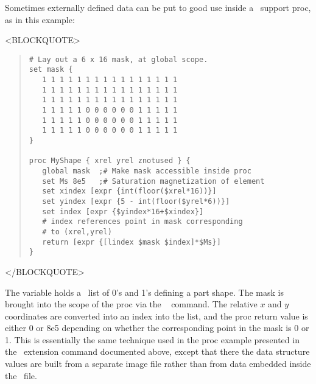%
Sometimes externally defined data can be put to good use inside a
\Tcl\ support proc, as in this example:
\begin{rawhtml}<BLOCKQUOTE>\end{rawhtml}
\begin{quote}
\begin{verbatim}
# Lay out a 6 x 16 mask, at global scope.
set mask {
   1 1 1 1 1 1 1 1 1 1 1 1 1 1 1 1
   1 1 1 1 1 1 1 1 1 1 1 1 1 1 1 1
   1 1 1 1 1 1 1 1 1 1 1 1 1 1 1 1
   1 1 1 1 1 0 0 0 0 0 0 1 1 1 1 1
   1 1 1 1 1 0 0 0 0 0 0 1 1 1 1 1
   1 1 1 1 1 0 0 0 0 0 0 1 1 1 1 1
}

proc MyShape { xrel yrel znotused } {
   global mask  ;# Make mask accessible inside proc
   set Ms 8e5   ;# Saturation magnetization of element
   set xindex [expr {int(floor($xrel*16))}]
   set yindex [expr {5 - int(floor($yrel*6))}]
   set index [expr {$yindex*16+$xindex}]
   # index references point in mask corresponding
   # to (xrel,yrel)
   return [expr {[lindex $mask $index]*$Ms}]
}
\end{verbatim}
\end{quote}
\begin{rawhtml}</BLOCKQUOTE>\end{rawhtml}
The variable  holds a \Tcl\ list of 0's and 1's defining a part
shape.  The mask is brought into the scope of the  proc via
the \Tcl\  command.  The relative $x$ and $y$ coordinates are
converted into an index into the list, and the proc return value is
either 0 or 8e5 depending on whether the corresponding point in the mask
is 0 or 1.  This is essentially the same technique used in the
 proc example presented in the
 \MIF\ extension command
documented above,
except that there the data structure values are built from a separate
image file rather than from data embedded inside the \MIF\ file.

